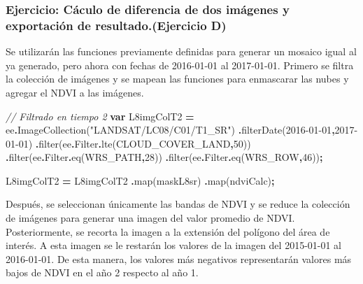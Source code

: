 \documentclass[
  12pt,
  letterpaper,
  twoside]{book}
\newenvironment{Shaded}{\begin{snugshade}}{\end{snugshade}}
\newcommand{\AttributeTok}[1]{\textcolor[rgb]{0.77,0.63,0.00}{#1}}
\newcommand{\CommentTok}[1]{\textcolor[rgb]{0.56,0.35,0.01}{\textit{#1}}}
\newcommand{\DecValTok}[1]{\textcolor[rgb]{0.00,0.00,0.81}{#1}}
\newcommand{\FunctionTok}[1]{\textcolor[rgb]{0.00,0.00,0.00}{#1}}
\newcommand{\KeywordTok}[1]{\textcolor[rgb]{0.13,0.29,0.53}{\textbf{#1}}}
\newcommand{\NormalTok}[1]{#1}
\newcommand{\OperatorTok}[1]{\textcolor[rgb]{0.81,0.36,0.00}{\textbf{#1}}}
\newcommand{\StringTok}[1]{\textcolor[rgb]{0.31,0.60,0.02}{#1}}
\begin{document}
\hypertarget{ejercicio-cuxe1culo-de-diferencia-de-dos-imuxe1genes-y-exportaciuxf3n-de-resultado.ejercicio-d}{%
\subsubsection{Ejercicio: Cáculo de diferencia de dos imágenes y exportación de resultado.(Ejercicio D)}\label{ejercicio-cuxe1culo-de-diferencia-de-dos-imuxe1genes-y-exportaciuxf3n-de-resultado.ejercicio-d}}

Se utilizarán las funciones previamente definidas para generar un mosaico igual al ya generado, pero ahora con fechas de 2016-01-01 al 2017-01-01. Primero se filtra la colección de imágenes y se mapean las funciones para enmascarar las nubes y agregar el NDVI a las imágenes.

\begin{Shaded}
\begin{Highlighting}[]
\CommentTok{// Filtrado en tiempo 2}
\KeywordTok{var}\NormalTok{ L8imgColT2 }\OperatorTok{=}\NormalTok{ ee}\OperatorTok{.}\FunctionTok{ImageCollection}\NormalTok{(}\StringTok{"LANDSAT/LC08/C01/T1\_SR"}\NormalTok{)}
  \OperatorTok{.}\FunctionTok{filterDate}\NormalTok{(}\StringTok{\textquotesingle{}2016{-}01{-}01\textquotesingle{}}\OperatorTok{,}\StringTok{\textquotesingle{}2017{-}01{-}01\textquotesingle{}}\NormalTok{)}
  \OperatorTok{.}\FunctionTok{filter}\NormalTok{(ee}\OperatorTok{.}\AttributeTok{Filter}\OperatorTok{.}\FunctionTok{lte}\NormalTok{(}\StringTok{\textquotesingle{}CLOUD\_COVER\_LAND\textquotesingle{}}\OperatorTok{,}\DecValTok{50}\NormalTok{))}
  \OperatorTok{.}\FunctionTok{filter}\NormalTok{(ee}\OperatorTok{.}\AttributeTok{Filter}\OperatorTok{.}\FunctionTok{eq}\NormalTok{(}\StringTok{\textquotesingle{}WRS\_PATH\textquotesingle{}}\OperatorTok{,}\DecValTok{28}\NormalTok{))}
  \OperatorTok{.}\FunctionTok{filter}\NormalTok{(ee}\OperatorTok{.}\AttributeTok{Filter}\OperatorTok{.}\FunctionTok{eq}\NormalTok{(}\StringTok{\textquotesingle{}WRS\_ROW\textquotesingle{}}\OperatorTok{,}\DecValTok{46}\NormalTok{))}\OperatorTok{;}

\NormalTok{L8imgColT2 }\OperatorTok{=}\NormalTok{ L8imgColT2}
  \OperatorTok{.}\FunctionTok{map}\NormalTok{(maskL8sr)}
  \OperatorTok{.}\FunctionTok{map}\NormalTok{(ndviCalc)}\OperatorTok{;}
\end{Highlighting}
\end{Shaded}

Después, se seleccionan únicamente las bandas de NDVI y se reduce la colección de imágenes para generar una imagen del valor promedio de NDVI. Posteriormente, se recorta la imagen a la extensión del polígono del área de interés. A esta imagen se le restarán los valores de la imagen del 2015-01-01 al 2016-01-01. De esta manera, los valores más negativos representarán valores más bajos de NDVI en el año 2 respecto al año 1.
\end{document}
